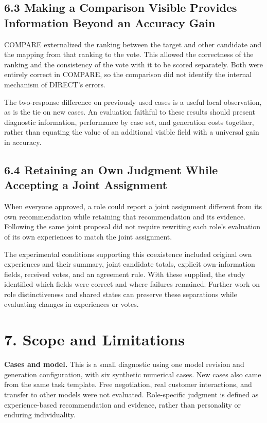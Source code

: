 \documentclass[10pt,a4paper]{article}
\begin{document}
\subsection{6.3 Making a Comparison Visible Provides Information Beyond an Accuracy Gain}\label{paper-04-making-a-comparison-visible-provides-information-beyond-an-accuracy-gain}

COMPARE externalized the ranking between the target and other candidate and the mapping from that ranking to the vote. This allowed the correctness of the ranking and the consistency of the vote with it to be scored separately. Both were entirely correct in COMPARE, so the comparison did not identify the internal mechanism of DIRECT's errors.

The two-response difference on previously used cases is a useful local observation, as is the tie on new cases. An evaluation faithful to these results should present diagnostic information, performance by case set, and generation costs together, rather than equating the value of an additional visible field with a universal gain in accuracy.

\subsection{6.4 Retaining an Own Judgment While Accepting a Joint Assignment}\label{paper-04-retaining-an-own-judgment-while-accepting-a-joint-assignment}

When everyone approved, a role could report a joint assignment different from its own recommendation while retaining that recommendation and its evidence. Following the same joint proposal did not require rewriting each role's evaluation of its own experiences to match the joint assignment.

The experimental conditions supporting this coexistence included original own experiences and their summary, joint candidate totals, explicit own-information fields, received votes, and an agreement rule. With these supplied, the study identified which fields were correct and where failures remained. Further work on role distinctiveness and shared states can preserve these separations while evaluating changes in experiences or votes.

\section{7. Scope and Limitations}\label{paper-04-scope-and-limitations}

\textbf{Cases and model.} This is a small diagnostic using one model revision and generation configuration, with six synthetic numerical cases. New cases also came from the same task template. Free negotiation, real customer interactions, and transfer to other models were not evaluated. Role-specific judgment is defined as experience-based recommendation and evidence, rather than personality or enduring individuality.
\end{document}
